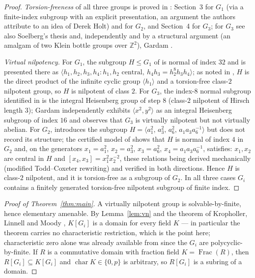 \documentclass[11pt]{amsart}
\theoremstyle{definition}
\newcommand{\GOne}{G_1}
\newcommand{\GTwo}{G_2}
\newcommand{\GThree}{G_3}
\newcommand{\Z}{\mathbb{Z}}
\begin{document}
\begin{proof}
\emph{Torsion-freeness} of all three groups is proved in \cite{NS}:
Section~3 for $\GOne$ (via a finite-index subgroup with an explicit
presentation, an argument the authors attribute to an idea of Derek Holt)
and for $\GTwo$, and Section~4 for $\GThree$; for $\GThree$ see also
Soelberg's thesis \cite[Theorem 3.1]{Soelberg} and, independently and by a
structural argument (an amalgam of two Klein bottle groups over $\Z^2$),
Gardam \cite[\S4]{GardamC}.

\emph{Virtual nilpotency.} For $\GOne$, the subgroup $H\le\GOne$ of
\cite[(3.2)]{NS} is normal of index $32$ and is presented there as
$\langle h_1,h_2,h_3,h_4 : h_1,h_2 \text{ central},\
h_4h_3=h_2^8h_3h_4\rangle$; as noted in \cite{NS}, $H$ is the direct
product of the infinite cyclic group $\langle h_1\rangle$ and a
torsion-free class-$2$ nilpotent group, so $H$ is nilpotent of class $2$.
For $\GThree$, the index-$8$ normal subgroup identified in
\cite[Theorem 3.1]{Soelberg} is the integral Heisenberg group of step $8$
(class-$2$ nilpotent of Hirsch length $3$); Gardam \cite[\S4]{GardamC}
independently exhibits $\langle x^2,y^2\rangle$ as an integral Heisenberg
subgroup of index $16$ and observes that $\GThree$ is virtually nilpotent
but not virtually abelian. For $\GTwo$, \cite{NS} introduces the subgroup
$H=\langle a_1^2,\,a_3^2,\,a_6^2,\,a_1a_3a_6^{-1}\rangle$ but does not
record its structure; the certified model of \cite[\S2]{companion} shows
that $H$ is normal of index $4$ in $\GTwo$ and, on the generators
$x_1=a_1^2$, $x_2=a_3^2$, $x_3=a_6^2$, $x_4=a_1a_3a_6^{-1}$, satisfies:
$x_1,x_2$ are central in $H$ and $[x_4,x_3]=x_1^2x_2^{-2}$, these relations
being derived mechanically (modified Todd--Coxeter rewriting) and verified
in both directions. Hence $H$ is class-$2$ nilpotent, and it is
torsion-free as a subgroup of $\GTwo$. In all three cases $G_i$ contains a
finitely generated torsion-free nilpotent subgroup of finite index.
\end{proof}

\begin{proof}[Proof of Theorem~\ref{thm:main}]
A virtually nilpotent group is solvable-by-finite, hence elementary
amenable. By Lemma~\ref{lem:vn} and the theorem of Kropholler, Linnell and
Moody \cite[Theorem 1.4]{KLM}, $K[G_i]$ is a domain for every field $K$ ---
in particular the theorem carries no characteristic restriction, which is
the point here; characteristic zero alone was already available from
\cite{Brown,FS} since the $G_i$ are polycyclic-by-finite. If $R$ is a
commutative domain with fraction field $K=\operatorname{Frac}(R)$, then
$R[G_i]\subseteq K[G_i]$ and $\operatorname{char}K\in\{0,p\}$ is arbitrary,
so $R[G_i]$ is a subring of a domain.
\end{proof}
\end{document}
